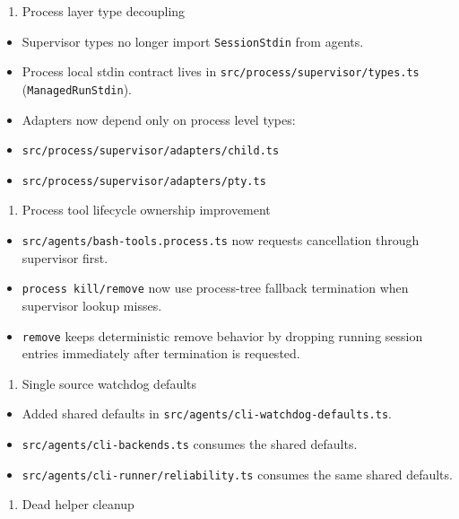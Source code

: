 \begin{enumerate}
  \item Process layer type decoupling
\end{enumerate}


\begin{itemize}
  \item Supervisor types no longer import \texttt{SessionStdin} from agents.
  \item Process local stdin contract lives in \texttt{src/process/supervisor/types.ts} (\texttt{ManagedRunStdin}).
  \item Adapters now depend only on process level types:
  \item \texttt{src/process/supervisor/adapters/child.ts}
  \item \texttt{src/process/supervisor/adapters/pty.ts}
\end{itemize}


\begin{enumerate}
  \item Process tool lifecycle ownership improvement
\end{enumerate}


\begin{itemize}
  \item \texttt{src/agents/bash-tools.process.ts} now requests cancellation through supervisor first.
  \item \texttt{process kill/remove} now use process-tree fallback termination when supervisor lookup misses.
  \item \texttt{remove} keeps deterministic remove behavior by dropping running session entries immediately after termination is requested.
\end{itemize}


\begin{enumerate}
  \item Single source watchdog defaults
\end{enumerate}


\begin{itemize}
  \item Added shared defaults in \texttt{src/agents/cli-watchdog-defaults.ts}.
  \item \texttt{src/agents/cli-backends.ts} consumes the shared defaults.
  \item \texttt{src/agents/cli-runner/reliability.ts} consumes the same shared defaults.
\end{itemize}


\begin{enumerate}
  \item Dead helper cleanup
\end{enumerate}


